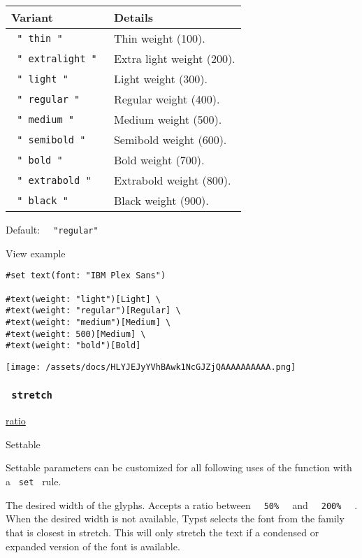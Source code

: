 \begin{longtable}[]{@{}ll@{}}
\toprule\noalign{}
Variant & Details \\
\midrule\noalign{}
\endhead
\bottomrule\noalign{}
\endlastfoot
\texttt{\ "\ thin\ "\ } & Thin weight (100). \\
\texttt{\ "\ extralight\ "\ } & Extra light weight (200). \\
\texttt{\ "\ light\ "\ } & Light weight (300). \\
\texttt{\ "\ regular\ "\ } & Regular weight (400). \\
\texttt{\ "\ medium\ "\ } & Medium weight (500). \\
\texttt{\ "\ semibold\ "\ } & Semibold weight (600). \\
\texttt{\ "\ bold\ "\ } & Bold weight (700). \\
\texttt{\ "\ extrabold\ "\ } & Extrabold weight (800). \\
\texttt{\ "\ black\ "\ } & Black weight (900). \\
\end{longtable}

Default: \texttt{\ }{\texttt{\ "regular"\ }}\texttt{\ }


View example

\begin{verbatim}
#set text(font: "IBM Plex Sans")

#text(weight: "light")[Light] \
#text(weight: "regular")[Regular] \
#text(weight: "medium")[Medium] \
#text(weight: 500)[Medium] \
#text(weight: "bold")[Bold]
\end{verbatim}

\texttt{[image: /assets/docs/HLYJEJyYVhBAwk1NcGJZjQAAAAAAAAAA.png]}

\subsubsection{\texorpdfstring{\texttt{\ stretch\ }}{ stretch }}\label{parameters-stretch}

\href{/docs/reference/layout/ratio/}{ratio}

{{ Settable }}

\label{parameters-stretch-settable-tooltip}
Settable parameters can be customized for all following uses of the
function with a \texttt{\ set\ } rule.

The desired width of the glyphs. Accepts a ratio between
\texttt{\ }{\texttt{\ 50\%\ }}\texttt{\ } and
\texttt{\ }{\texttt{\ 200\%\ }}\texttt{\ } . When the desired width is
not available, Typst selects the font from the family that is closest in
stretch. This will only stretch the text if a condensed or expanded
version of the font is available.

